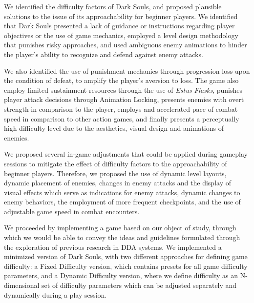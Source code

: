 We identified the difficulty factors of Dark Souls, and proposed plausible solutions to the issue of its approachability for beginner players. We identified that Dark Souls presented a lack of guidance or instructions regarding player objectives or the use of game mechanics, employed a level design methodology that punishes risky approaches, and used ambiguous enemy animations to hinder the player's ability to recognize and defend against enemy attacks.

We also identified the use of punishment mechanics through progression loss upon the condition of defeat, to amplify the player's aversion to loss. The game also employ limited sustainment resources through the use of \emph{Estus Flasks}, punishes player attack decisions through Animation Locking, presents enemies with overt strength in comparison to the player, employs and accelerated pace of combat speed in comparison to other action games, and finally presents a perceptually high difficulty level due to the aesthetics, visual design and animations of enemies.

We proposed several in-game adjustments that could be applied during gameplay sessions to mitigate the effect of difficulty factors to the approachability of beginner players. Therefore, we proposed the use of dynamic level layouts, dynamic placement of enemies, changes in enemy attacks and the display of visual effects which serve as indications for enemy attacks, dynamic changes to enemy behaviors, the employment of more frequent checkpoints, and the use of adjustable game speed in combat encounters.

We proceeded by implementing a game based on our object of study, through which we would be able to convey the ideas and guidelines formulated through the exploration of previous research in DDA systems. We implemented a minimized version of Dark Souls, with two different approaches for defining game difficulty: a Fixed Difficulty version, which contains presets for all game difficulty parameters, and a Dynamic Difficulty version, where we define difficulty as an N-dimensional set of difficulty parameters which can be adjusted separately and dynamically during a play session.

